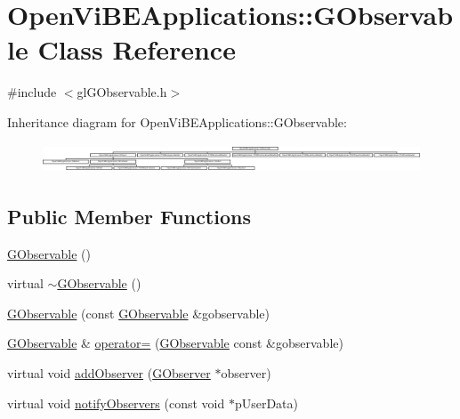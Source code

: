 \hypertarget{classOpenViBEApplications_1_1GObservable}{
\section{OpenViBEApplications::GObservable Class Reference}
\label{classOpenViBEApplications_1_1GObservable}
}


{\ttfamily \#include $<$glGObservable.h$>$}

Inheritance diagram for OpenViBEApplications::GObservable:\begin{figure}[H]
\begin{center}
\leavevmode
\includegraphics[height=0.880503cm]{classOpenViBEApplications_1_1GObservable}
\end{center}
\end{figure}
\subsection*{Public Member Functions}
\begin{DoxyCompactItemize}
\item 
\hyperlink{classOpenViBEApplications_1_1GObservable_ac9fdceed62feeb73efae75c7d9ecf184}{GObservable} ()
\item 
virtual \hyperlink{classOpenViBEApplications_1_1GObservable_a924879d1fbeab6546cdbd127efd56132}{$\sim$GObservable} ()
\item 
\hyperlink{classOpenViBEApplications_1_1GObservable_a41637818b8b04ab963dbcf7059047105}{GObservable} (const \hyperlink{classOpenViBEApplications_1_1GObservable}{GObservable} \&gobservable)
\item 
\hyperlink{classOpenViBEApplications_1_1GObservable}{GObservable} \& \hyperlink{classOpenViBEApplications_1_1GObservable_a66335d1ba9e07d5696debd30489bc587}{operator=} (\hyperlink{classOpenViBEApplications_1_1GObservable}{GObservable} const \&gobservable)
\item 
virtual void \hyperlink{classOpenViBEApplications_1_1GObservable_a1fb6672b187acd1fe6cbb162b5d09b79}{addObserver} (\hyperlink{classOpenViBEApplications_1_1GObserver}{GObserver} $\ast$observer)
\item 
virtual void \hyperlink{classOpenViBEApplications_1_1GObservable_aaf7305b9dc1b2fa3f7f3eb47a19be746}{notifyObservers} (const void $\ast$pUserData)
\end{DoxyCompactItemize}
